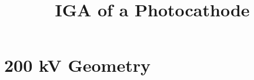 \documentclass[10pt,a4paper]{article}
\begin{document}
\title{IGA of a Photocathode}
\date{}
\author{}
\maketitle

\tableofcontents

% 

\section{200 kV Geometry}


\clearpage
{}

\end{document}
